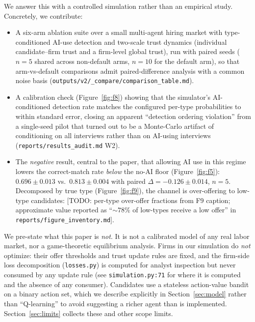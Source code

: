 \documentclass[11pt]{article}
\begin{document}
We answer this with a controlled simulation rather than an empirical study.
Concretely, we contribute:

\begin{itemize}
  \item A six-arm ablation suite over a small multi-agent hiring market with
        type-conditioned AI-use detection and two-scale trust dynamics
        (individual candidate--firm trust and a firm-level global trust),
        run with paired seeds (\(n=5\) shared across non-default arms,
        \(n=10\) for the default arm), so that arm-vs-default comparisons
        admit paired-difference analysis with a common noise basis
        (\texttt{outputs/v2/\_compare/comparison\_table.md}).

  \item A calibration check (Figure~\ref{fig:f8}) showing that the simulator's
        AI-conditioned detection rate matches the configured per-type
        probabilities to within standard error, closing an apparent
        ``detection ordering violation'' from a single-seed pilot that turned
        out to be a Monte-Carlo artifact of conditioning on all interviews
        rather than on AI-using interviews
        (\texttt{reports/results\_audit.md} W2).

  \item The \emph{negative} result, central to the paper, that allowing AI use
        in this regime lowers the correct-match rate \emph{below} the no-AI
        floor (Figure~\ref{fig:f5}): \(0.696 \pm 0.013\) vs.\ \(0.813 \pm 0.004\)
        with paired \(\Delta = -0.126 \pm 0.014\), \(n=5\). Decomposed by true
        type (Figure~\ref{fig:f9}), the channel is over-offering to low-type
        candidates: \([\)TODO: per-type over-offer fractions from F9 caption;
        approximate value reported as ``\(\sim 78\%\) of low-types receive a
        low offer'' in \texttt{reports/figure\_inventory.md}\(]\).
\end{itemize}

We pre-state what this paper is \emph{not}. It is not a calibrated model of any
real labor market, nor a game-theoretic equilibrium analysis. Firms in our
simulation do \emph{not} optimize: their offer thresholds and trust update rules
are fixed, and the firm-side loss decomposition (\texttt{losses.py}) is computed
for analyst inspection but never consumed by any update rule (see
\texttt{simulation.py:71} for where it is computed and the absence of any
consumer). Candidates use a stateless action-value bandit on a binary action set,
which we describe explicitly in Section~\ref{sec:model} rather than ``Q-learning''
to avoid suggesting a richer agent than is implemented. Section~\ref{sec:limits}
collects these and other scope limits.
\end{document}
